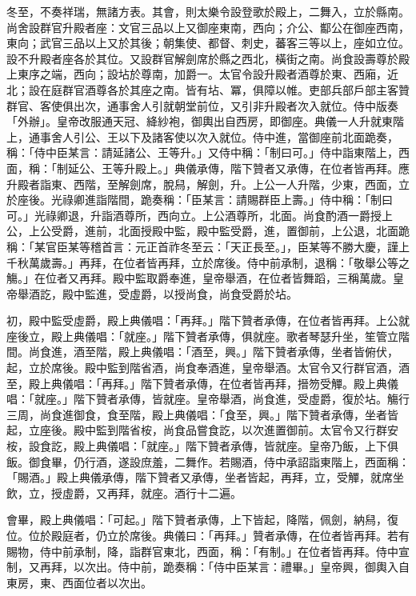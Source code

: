 \begin{pinyinscope}
 冬至，不奏祥瑞，無諸方表。其會，則太樂令設登歌於殿上，二舞入，立於縣南。尚舍設群官升殿者座：文官三品以上又御座東南，西向；介公、酅公在御座西南，東向；武官三品以上又於其後；朝集使、都督、刺史，蕃客三等以上，座如立位。設不升殿者座各於其位。又設群官解劍席於縣之西北，橫街之南。尚食設壽尊於殿上東序之端，西向；設坫於尊南，加爵一。太官令設升殿者酒尊於東、西廂，近北；設在庭群官酒尊各於其座之南。皆有坫、冪，俱障以帷。吏部兵部戶部主客贊群官、客使俱出次，通事舍人引就朝堂前位，又引非升殿者次入就位。侍中版奏「外辦」。皇帝改服通天冠、絳紗袍，御輿出自西房，即御座。典儀一人升就東階上，通事舍人引公、王以下及諸客使以次入就位。侍中進，當御座前北面跪奏，稱：「侍中臣某言：請延諸公、王等升。」又侍中稱：「制曰可。」侍中詣東階上，西面，稱：「制延公、王等升殿上。」典儀承傳，階下贊者又承傳，在位者皆再拜。應升殿者詣東、西階，至解劍席，脫舄，解劍，升。上公一人升階，少東，西面，立於座後。光祿卿進詣階間，跪奏稱：「臣某言：請賜群臣上壽。」侍中稱：「制曰可。」光祿卿退，升詣酒尊所，西向立。上公酒尊所，北面。尚食酌酒一爵授上公，上公受爵，進前，北面授殿中監，殿中監受爵，進，置御前，上公退，北面跪稱：「某官臣某等稽首言：元正首祚冬至云：「天正長至。」，臣某等不勝大慶，謹上千秋萬歲壽。」再拜，在位者皆再拜，立於席後。侍中前承制，退稱：「敬舉公等之觴。」在位者又再拜。殿中監取爵奉進，皇帝舉酒，在位者皆舞蹈，三稱萬歲。皇帝舉酒訖，殿中監進，受虛爵，以授尚食，尚食受爵於坫。



 初，殿中監受虛爵，殿上典儀唱：「再拜。」階下贊者承傳，在位者皆再拜。上公就座後立，殿上典儀唱：「就座。」階下贊者承傳，俱就座。歌者琴瑟升坐，笙管立階間。尚食進，酒至階，殿上典儀唱：「酒至，興。」階下贊者承傳，坐者皆俯伏，起，立於席後。殿中監到階省酒，尚食奉酒進，皇帝舉酒。太官令又行群官酒，酒至，殿上典儀唱：「再拜。」階下贊者承傳，在位者皆再拜，搢笏受觶。殿上典儀唱：「就座。」階下贊者承傳，皆就座。皇帝舉酒，尚食進，受虛爵，復於坫。觴行三周，尚食進御食，食至階，殿上典儀唱：「食至，興。」階下贊者承傳，坐者皆起，立座後。殿中監到階省桉，尚食品嘗食訖，以次進置御前。太官令又行群安桉，設食訖，殿上典儀唱：「就座。」階下贊者承傳，皆就座。皇帝乃飯，上下俱飯。御食畢，仍行酒，遂設庶羞，二舞作。若賜酒，侍中承詔詣東階上，西面稱：「賜酒。」殿上典儀承傳，階下贊者又承傳，坐者皆起，再拜，立，受觶，就席坐飲，立，授虛爵，又再拜，就座。酒行十二遍。



 會畢，殿上典儀唱：「可起。」階下贊者承傳，上下皆起，降階，佩劍，納舄，復位。位於殿庭者，仍立於席後。典儀曰：「再拜。」贊者承傳，在位者皆再拜。若有賜物，侍中前承制，降，詣群官東北，西面，稱：「有制。」在位者皆再拜。侍中宣制，又再拜，以次出。侍中前，跪奏稱：「侍中臣某言：禮畢。」皇帝興，御輿入自東房，東、西面位者以次出。




\end{pinyinscope}
